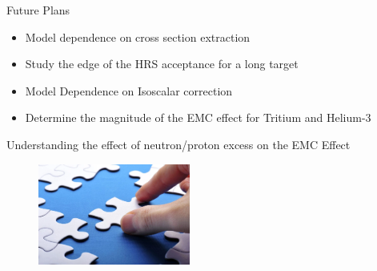 \documentclass[12pt,usenames,dvipsnames]{beamer}
\begin{document}
\begin{frame}{}
\begin{block}{Future Plans}
	\begin{itemize}
		\item Model dependence on cross section extraction
		\item Study the edge of the HRS acceptance for a long target 
		\item Model Dependence on Isoscalar correction
		\item Determine the magnitude of the EMC effect for Tritium and Helium-3
	\end{itemize}
\centering
\large{Understanding the effect of neutron/proton excess on the EMC Effect}
\end{block}

\begin{figure}
	\includegraphics[width =5cm]{../images/puzzle2.png}
\end{figure}

\end{frame}


\end{document}
